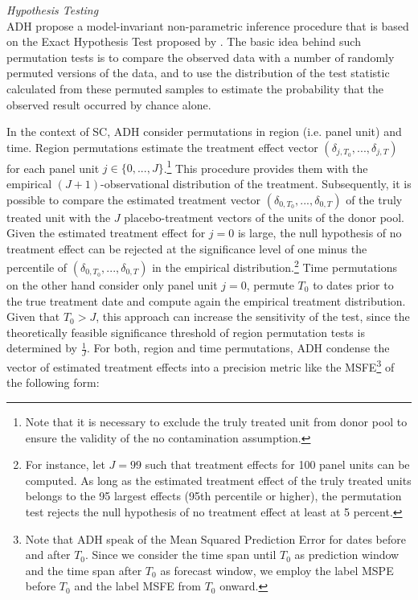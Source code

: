 \textit{Hypothesis Testing} \\
\ac{ADH} propose a model-invariant non-parametric inference procedure that is based on the Exact Hypothesis Test proposed by \cite{fisher:1971}. The basic idea behind such permutation tests is to compare the observed data with a number of randomly permuted versions of the data, and to use the distribution of the test statistic calculated from these permuted samples to estimate the probability that the observed result occurred by chance alone. 

In the context of \ac{SC}, \ac{ADH} consider permutations in region (i.e. panel unit) and time. Region permutations estimate the treatment effect vector $(\delta_{j,T_0}, ..., \delta_{j,T})$ for each panel unit $j \in \{0, ..., J \}$.\footnote{Note that it is necessary to exclude the truly treated unit from donor pool to ensure the validity of the no contamination assumption.} This procedure provides them with the empirical $(J+1)$-observational distribution of the treatment. Subsequently, it is possible to compare the estimated treatment vector $(\delta_{0,T_0}, ..., \delta_{0,T})$ of the truly treated unit with the $J$ placebo-treatment vectors of the units of the donor pool. Given the estimated treatment effect for $j=0$ is large, the null hypothesis of no treatment effect can be rejected at the significance level of one minus the percentile of $(\delta_{0,T_0}, ..., \delta_{0,T})$ in the empirical distribution.\footnote{For instance, let $J = 99$ such that treatment effects for 100 panel units can be computed. As long as the estimated treatment effect of the truly treated units belongs to the 95 largest effects (95th percentile or higher), the permutation test rejects the null hypothesis of no treatment effect at least at 5 percent.} Time permutations on the other hand consider only panel unit $j = 0$, permute $T_0$ to dates prior to the true treatment date and compute again the empirical treatment distribution. Given that $T_0 > J$, this approach can increase the sensitivity of the test, since the theoretically feasible significance threshold of region permutation tests is determined by $\frac{1}{J}$. For both, region and time permutations, \ac{ADH} condense the vector of estimated treatment effects into a precision metric like the \ac{MSFE}\footnote{Note that \ac{ADH} speak of the Mean Squared Prediction Error for dates before and after $T_0$. Since we consider the time span until $T_0$ as prediction window and the time span after $T_0$ as forecast window, we employ the label \ac{MSPE} before $T_0$ and the label \ac{MSFE} from $T_0$ onward.} of the following form:
